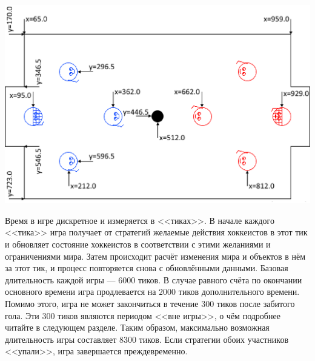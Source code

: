 \includegraphics{images/FieldScheme-3vs3.eps}

Время в игре дискретное и измеряется в <<тиках>>. В начале каждого <<тика>> игра получает от стратегий желаемые действия хоккеистов в этот
тик и обновляет состояние хоккеистов в соответствии с этими желаниями и ограничениями мира. Затем происходит расчёт изменения мира и
объектов в нём за этот тик, и процесс повторяется снова с обновлёнными данными. Базовая длительность каждой игры --- $6000$ тиков.
В случае равного счёта по окончании основного времени игра продлевается на $2000$ тиков дополнительного времени. Помимо этого, игра не может
закончиться в течение $300$ тиков после забитого гола. Эти $300$ тиков являются периодом <<вне игры>>, о чём подробнее читайте в следующем
разделе. Таким образом, максимально возможная длительность игры составляет $8300$ тиков. Если стратегии обоих участников <<упали>>, игра
завершается преждевременно.


